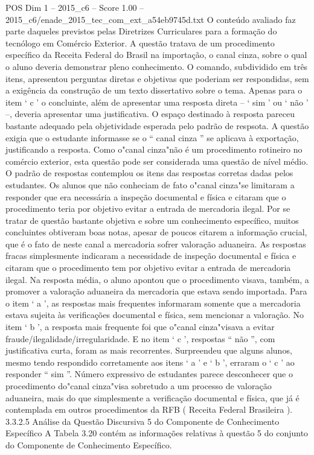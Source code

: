 \begin{textsample}{POS Dim 1 – 2015\_c6 – Score 1.00 – 2015\_c6/enade\_2015\_tec\_com\_ext\_a54eb9745d.txt}
O conteúdo avaliado faz parte daqueles previstos pelas Diretrizes Curriculares para a formação do tecnólogo em Comércio Exterior.
A questão tratava de um procedimento específico da Receita Federal do Brasil na importação, o canal cinza, sobre o qual o aluno deveria demonstrar pleno conhecimento.
O comando, subdividido em três itens, apresentou perguntas diretas e objetivas que poderiam ser respondidas, sem a exigência da construção de um texto dissertativo sobre o tema.
Apenas para o item ‘ c ’ o concluinte, além de apresentar uma resposta direta – ‘ sim ’ ou ‘ não ’ –, deveria apresentar uma justificativa.
O espaço destinado à resposta pareceu bastante adequado pela objetividade esperada pelo padrão de respsota.
A questão exigia que o estudante informasse se o “ canal cinza ” se aplicava à exportação, justificando a resposta.
Como o"canal cinza"não é um procedimento rotineiro no comércio exterior, esta questão pode ser considerada uma questão de nível médio.
O padrão de respostas contemplou os itens das respostas corretas dadas pelos estudantes.
Os alunos que não conheciam de fato o"canal cinza"se limitaram a responder que era necessária a inspeção documental e física e citaram que o procedimento teria por objetivo evitar a entrada de mercadoria ilegal.
Por se tratar de questão bastante objetiva e sobre um conhecimento específico, muitos concluintes obtiveram boas notas, apesar de poucos citarem a informação crucial, que é o fato de neste canal a mercadoria sofrer valoração aduaneira.
As respostas fracas simplesmente indicaram a necessidade de inspeção documental e física e citaram que o procedimento tem por objetivo evitar a entrada de mercadoria ilegal.
Na resposta média, o aluno apontou que o procedimento visava, também, a promover a valoração aduaneira da mercadoria que estava sendo importada.
Para o item ‘ a ’, as respostas mais frequentes informaram somente que a mercadoria estava sujeita às verificações documental e física, sem mencionar a valoração.
No item ‘ b ’, a resposta mais frequente foi que o"canal cinza"visava a evitar fraude/ilegalidade/irregularidade.
E no item ‘ c ’, respostas “ não ”, com justificativa curta, foram as mais recorrentes.
Surpreendeu que alguns alunos, mesmo tendo respondido corretamente aos itens ‘ a ’ e ‘ b ’, erraram o ‘ c ’ ao responder “ sim ”.
Número expressivo de estudantes parece desconhecer que o procedimento do"canal cinza"visa sobretudo a um processo de valoração aduaneira, mais do que simplesmente a verificação documental e física, que já é contemplada em outros procedimentos da RFB ( Receita Federal Brasileira ). 3.3.2.5 Análise da Questão Discursiva 5 do Componente de Conhecimento Específico A Tabela 3.20 contém as informações relativas à questão 5 do conjunto do Componente de Conhecimento Específico.

\end{textsample}
